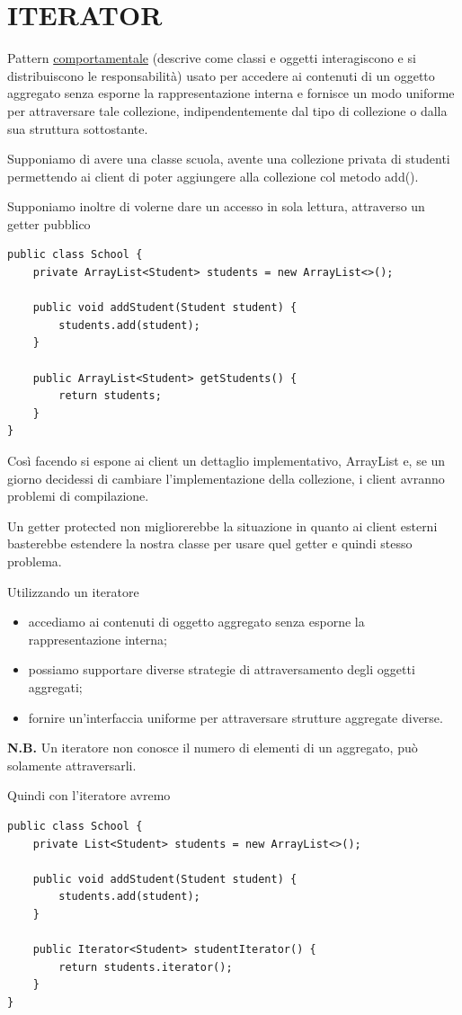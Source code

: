 \chapter{ITERATOR}

Pattern \underline{comportamentale} (descrive come classi e oggetti interagiscono e si distribuiscono le responsabilità) usato per accedere ai contenuti di un oggetto 
aggregato senza esporne la rappresentazione interna e fornisce un modo uniforme per attraversare tale collezione, indipendentemente dal tipo di collezione o dalla sua
struttura sottostante.

Supponiamo di avere una classe scuola, avente una collezione privata di studenti permettendo ai client di poter aggiungere alla collezione col metodo add().

Supponiamo inoltre di volerne dare un accesso in sola lettura, attraverso un getter pubblico
\begin{lstlisting}
public class School {
    private ArrayList<Student> students = new ArrayList<>();
    
    public void addStudent(Student student) {
        students.add(student);
    }
    
    public ArrayList<Student> getStudents() {
        return students;
    }
}
\end{lstlisting}

Così facendo si espone ai client un dettaglio implementativo, ArrayList e, se un giorno decidessi di cambiare l'implementazione della collezione, i client avranno 
problemi di compilazione.

Un getter protected non migliorerebbe la situazione in quanto ai client esterni basterebbe estendere la nostra classe per usare quel getter e quindi stesso problema.

Utilizzando un iteratore
\begin{itemize}
    \item accediamo ai contenuti di oggetto aggregato senza esporne la rappresentazione interna;
    \item possiamo supportare diverse strategie di attraversamento degli oggetti aggregati;
    \item fornire un’interfaccia uniforme per attraversare strutture aggregate diverse.
\end{itemize}

\textbf{N.B.} Un iteratore non conosce il numero di elementi di un aggregato, può solamente attraversarli.

Quindi con l'iteratore avremo
\begin{lstlisting}
public class School {
    private List<Student> students = new ArrayList<>();
    
    public void addStudent(Student student) {
        students.add(student);
    }

    public Iterator<Student> studentIterator() {
        return students.iterator();
    }
}
\end{lstlisting}

